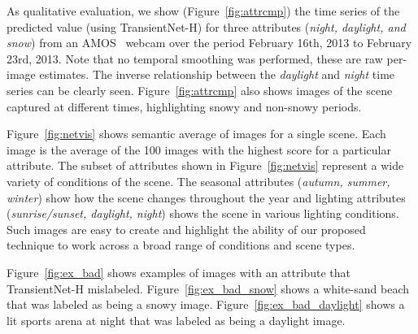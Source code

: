 \documentclass[10pt,twocolumn,letterpaper]{article}
\newcommand{\todo}[1]{\textcolor{red}{todo: {\em #1}}}
\newcommand{\figref}[1]{Figure~\ref{fig:#1}}
\begin{document}

As qualitative evaluation, we show (\figref{attrcmp}) the time series
of the predicted value (using TransientNet-H) for three attributes
(\textit{night, daylight, and snow}) from an AMOS~\cite{jacobs07amos}
webcam over the period February 16th, 2013 to February 23rd, 2013.
Note that no temporal smoothing was performed, these are raw per-image
estimates.  The inverse relationship between the \textit{daylight} and
\textit{night} time series can be clearly seen.  \figref{attrcmp} also
shows images of the scene captured at different times, highlighting
snowy and non-snowy periods.

\figref{netvis} shows semantic average of images for a single scene.  Each
image is the average of the 100 images with the highest score for a particular
attribute.  The subset of attributes shown in \figref{netvis} represent a wide
variety of conditions of the scene.  The seasonal attributes (\textit{autumn,
summer, winter}) show how the scene changes throughout the year and lighting
attributes (\textit{sunrise/sunset, daylight, night}) shows the scene in
various lighting conditions.  Such images are easy to create and highlight the
ability of our proposed technique to work across a broad range of conditions
and scene types. 

\figref{ex_bad} shows examples of images with an attribute that TransientNet-H
mislabeled.  \figref{ex_bad_snow} shows a white-sand beach that was labeled as
being a snowy image.  \figref{ex_bad_daylight} shows a lit sports arena at night
that was labeled as being a daylight image.



%
\end{document}
